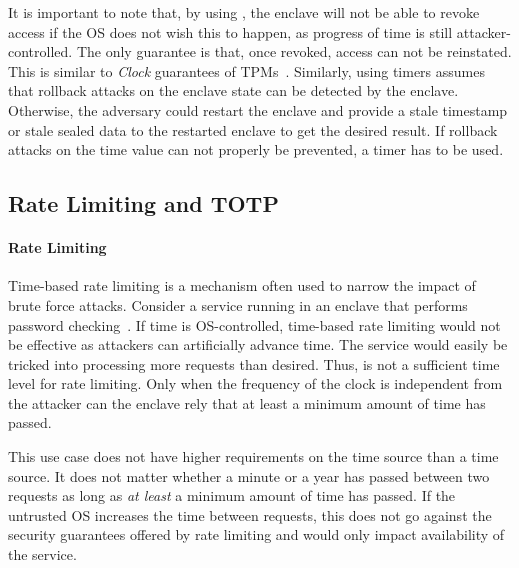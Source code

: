 It is important to note that, by using \Tone, the enclave will not be able to
revoke access if the OS does not wish this to happen, as progress of time is
still attacker-controlled. The only guarantee is that, once revoked, access can
not be reinstated. This is similar to \emph{Clock} guarantees of
\acp{TPM}~\cite{tpmdoc}. Similarly, using \Tone timers assumes that
rollback attacks on the enclave state can be detected by the enclave. Otherwise,
the adversary could restart the enclave and provide a stale timestamp or stale
sealed data to the restarted enclave to get the desired result. If rollback
attacks on the time value can not properly be prevented, a \Ttwo timer has to be
used.

\subsection{Rate Limiting and TOTP}

\paragraph{Rate Limiting}
%
Time-based rate limiting is a mechanism often used to narrow the impact of brute
force attacks. Consider a service running in an enclave that performs password
checking~\cite{krawiecka2018safekeeper}. If time is OS-controlled, time-based
rate limiting would not be effective as attackers can artificially advance time.
The service would easily be tricked into processing more requests than desired.
Thus, \Tone{} is not a sufficient time level for rate limiting. Only when the
frequency of the clock is independent from the attacker can the enclave rely
that at least a minimum amount of time has passed.

This use case does not have higher requirements on the time source than a \Ttwo
time source. It does not matter whether a minute or a year has passed between
two requests as long as \textit{at least} a minimum amount of time has passed.
If the untrusted OS increases the time between requests, this does not go
against the security guarantees offered by rate limiting and would only impact
availability of the service.

